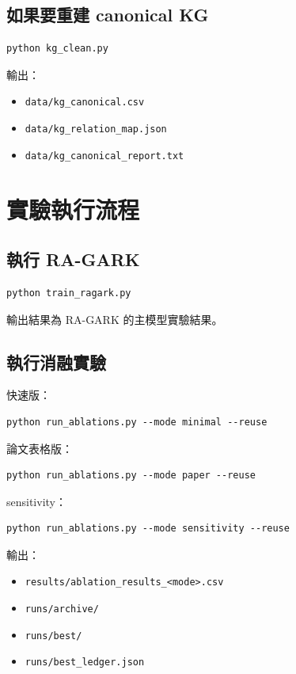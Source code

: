 \documentclass[12pt,a4paper,fontset=none]{ctexart}
\newcommand{\cmd}[1]{\texttt{#1}}
\begin{document}
\subsection{如果要重建 canonical KG}

\begin{verbatim}
python kg_clean.py
\end{verbatim}

輸出：

\begin{itemize}
  \item \cmd{data/kg\_canonical.csv}
  \item \cmd{data/kg\_relation\_map.json}
  \item \cmd{data/kg\_canonical\_report.txt}
\end{itemize}

\section{實驗執行流程}

\subsection{執行 RA-GARK}

\begin{verbatim}
python train_ragark.py
\end{verbatim}

輸出結果為 RA-GARK 的主模型實驗結果。

\subsection{執行消融實驗}

快速版：

\begin{verbatim}
python run_ablations.py --mode minimal --reuse
\end{verbatim}

論文表格版：

\begin{verbatim}
python run_ablations.py --mode paper --reuse
\end{verbatim}

sensitivity：

\begin{verbatim}
python run_ablations.py --mode sensitivity --reuse
\end{verbatim}

輸出：

\begin{itemize}
  \item \cmd{results/ablation\_results\_<mode>.csv}
  \item \cmd{runs/archive/}
  \item \cmd{runs/best/}
  \item \cmd{runs/best\_ledger.json}
\end{itemize}
\end{document}
